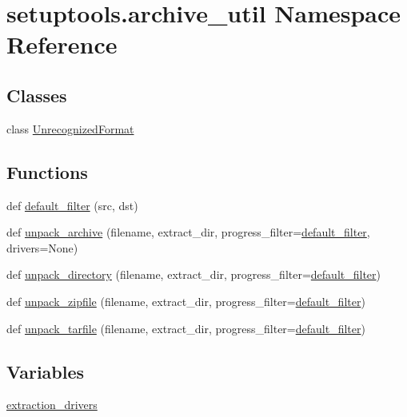 \hypertarget{namespacesetuptools_1_1archive__util}{}\section{setuptools.\+archive\+\_\+util Namespace Reference}
\label{namespacesetuptools_1_1archive__util}
\subsection*{Classes}
\begin{DoxyCompactItemize}
\item 
class \hyperlink{classsetuptools_1_1archive__util_1_1UnrecognizedFormat}{Unrecognized\+Format}
\end{DoxyCompactItemize}
\subsection*{Functions}
\begin{DoxyCompactItemize}
\item 
def \hyperlink{namespacesetuptools_1_1archive__util_adede8e93e57be04915ea0d27831b654b}{default\+\_\+filter} (src, dst)
\item 
def \hyperlink{namespacesetuptools_1_1archive__util_a50b89b80cdc264528d20a0b7a7964aa4}{unpack\+\_\+archive} (filename, extract\+\_\+dir, progress\+\_\+filter=\hyperlink{namespacesetuptools_1_1archive__util_adede8e93e57be04915ea0d27831b654b}{default\+\_\+filter}, drivers=None)
\item 
def \hyperlink{namespacesetuptools_1_1archive__util_a6ad75ce90d1cbed27a1d5a1dc6e4dda3}{unpack\+\_\+directory} (filename, extract\+\_\+dir, progress\+\_\+filter=\hyperlink{namespacesetuptools_1_1archive__util_adede8e93e57be04915ea0d27831b654b}{default\+\_\+filter})
\item 
def \hyperlink{namespacesetuptools_1_1archive__util_a01c6de8920234e1bcb47befda68d40c4}{unpack\+\_\+zipfile} (filename, extract\+\_\+dir, progress\+\_\+filter=\hyperlink{namespacesetuptools_1_1archive__util_adede8e93e57be04915ea0d27831b654b}{default\+\_\+filter})
\item 
def \hyperlink{namespacesetuptools_1_1archive__util_aee037d06b845eaf69e229fafccae35b9}{unpack\+\_\+tarfile} (filename, extract\+\_\+dir, progress\+\_\+filter=\hyperlink{namespacesetuptools_1_1archive__util_adede8e93e57be04915ea0d27831b654b}{default\+\_\+filter})
\end{DoxyCompactItemize}
\subsection*{Variables}
\begin{DoxyCompactItemize}
\item 
\hyperlink{namespacesetuptools_1_1archive__util_a2648d1e9cc1b921fec949efb97c64295}{extraction\+\_\+drivers}
\end{DoxyCompactItemize}



